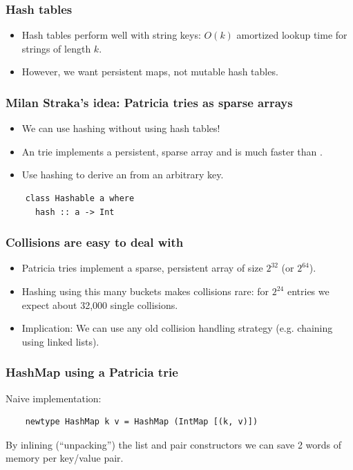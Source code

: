\documentclass[xetex,mathserif,serif]{beamer}
\newcommand{\code}[1]{\mbox{\texttt{\small{\color{CodeColor}{#1}}}}}
\begin{document}
\begin{frame}
  \frametitle{Hash tables}
  \begin{itemize}
  \item Hash tables perform well with string keys: $O(k)$ amortized
    lookup time for strings of length $k$.
  \item However, we want persistent maps, not mutable hash tables.
  \end{itemize}
\end{frame}

\begin{frame}[fragile]
  \frametitle{Milan Straka's idea: Patricia tries as sparse arrays}
  \begin{itemize}
  \item We can use hashing without using hash tables!
  \item An \code{Data.IntMap} trie implements a persistent, sparse
    array and is much faster than \code{Data.Map}.
  \item Use hashing to derive an \code{Int} from an arbitrary
    key.
  \end{itemize}
  \begin{lstlisting}
    class Hashable a where
      hash :: a -> Int
  \end{lstlisting}
\end{frame}

\begin{frame}
  \frametitle{Collisions are easy to deal with}
  \begin{itemize}
  \item Patricia tries implement a sparse, persistent array of size
    $2^{32}$ (or $2^{64}$).
  \item Hashing using this many buckets makes collisions rare: for
    $2^{24}$ entries we expect about 32,000 single collisions.
  \item Implication: We can use any old collision handling strategy
    (e.g. chaining using linked lists).
  \end{itemize}
\end{frame}

\begin{frame}[fragile]
  \frametitle{HashMap using a Patricia trie}

  Naive implementation:

  \begin{lstlisting}
    newtype HashMap k v = HashMap (IntMap [(k, v)])
  \end{lstlisting}

  By inlining (``unpacking'') the list and pair constructors we can
  save 2 words of memory per key/value pair.
\end{frame}
\end{document}
